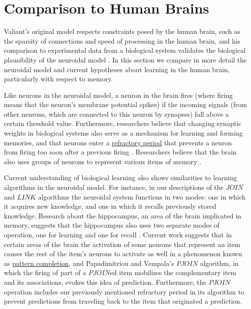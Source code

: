 \documentclass[letterpaper, 12pt]{article}
\begin{document}
\section{Comparison to Human Brains}
Valiant's original model respects constraints posed by the human brain, such as the sparsity of connections and speed of processing in the human brain, and his comparison to experimental data from a biological system validates the biological plausibility of the neuroidal model \cite{valiant_quantitative_2006}. In this section we compare in more detail the neuroidal model and current hypotheses about learning in the human brain, particularly with respect to memory.

Like neurons in the neuroidal model, a neuron in the brain fires (where firing means that the neuron's membrane potential spikes) if the incoming signals (from other neurons, which are connected to this neuron by synapses) fall above a certain threshold value. Furthermore, researchers believe that changing synaptic weights in biological systems also serve as a mechanism for learning and forming memories, and that neurons enter a \underline{refractory period} that prevents a neuron from firing too soon after a previous firing \cite{cooper_donald_2005}. Researchers believe that the brain also uses groups of neurons to represent various items of memory \cite{schacter_richard_1978}.

Current understanding of biological learning also shows similarities to learning algorithms in the neuroidal model. For instance, in our descriptions of the $JOIN$ and $LINK$ algorithms the neuroidal system functions in two modes: one in which it acquires new knowledge, and one in which it recalls previously stored knowledge. Research about the hippocampus, an area of the brain implicated in memory, suggests that the hippocampus also uses two separate modes of operation, one for learning and one for recall \cite{treves_computational_1992}. Current work suggests that in certain areas of the brain the activation of some neurons that represent an item causes the rest of the item's neurons to activate as well in a phenomenon known as \underline{pattern completion}, and Papadimitriou and Vempala's $PJOIN$ algorithm, in which the firing of part of a $PJOIN$ed item mobilizes the complementary item and its associations, evokes this idea of prediction. Furthermore, the $PJOIN$ operation includes our previously mentioned refractory period in its algorithm to prevent predictions from traveling back to the item that originated a prediction.
\end{document}
